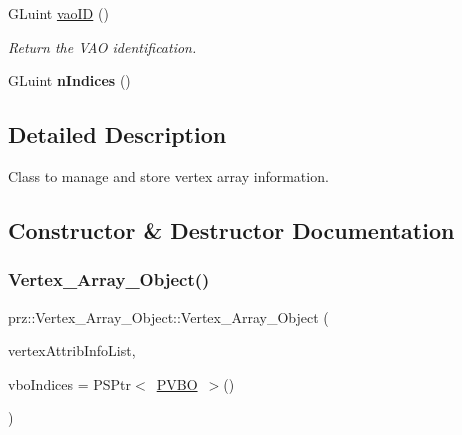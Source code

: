 \begin{DoxyCompactItemize}
G\+Luint \mbox{\hyperlink{classprz_1_1_vertex___array___object_abe38c2f93a114a1022137ef1b961d91b}{vao\+ID}} ()
\begin{DoxyCompactList}\small\item\em Return the V\+AO identification. \end{DoxyCompactList}\item 
\mbox{\label{classprz_1_1_vertex___array___object_a5163e3ef81b9e680cb5c51a7e4b8b1a0}} 
G\+Luint {\bfseries n\+Indices} ()
\end{DoxyCompactItemize}


\subsection{Detailed Description}
Class to manage and store vertex array information. 



\subsection{Constructor \& Destructor Documentation}
\mbox{\label{classprz_1_1_vertex___array___object_a83368b8c0aa93db50307df788234cfec}} 
\subsubsection{\texorpdfstring{Vertex\_Array\_Object()}{Vertex\_Array\_Object()}}
{\footnotesize\ttfamily prz\+::\+Vertex\+\_\+\+Array\+\_\+\+Object\+::\+Vertex\+\_\+\+Array\+\_\+\+Object (\begin{DoxyParamCaption}\item[{const P\+List$<$ \mbox{\hyperlink{structprz_1_1_vertex___attribute___information}{P\+V\+AI}} $>$ \&}]{vertex\+Attrib\+Info\+List,  }\item[{const P\+S\+Ptr$<$ \mbox{\hyperlink{classprz_1_1_vertex___buffer___object}{P\+V\+BO}} $>$ \&}]{vbo\+Indices = {\ttfamily PSPtr$<$~\mbox{\hyperlink{classprz_1_1_vertex___buffer___object}{P\+V\+BO}}~$>$()} }\end{DoxyParamCaption})}



